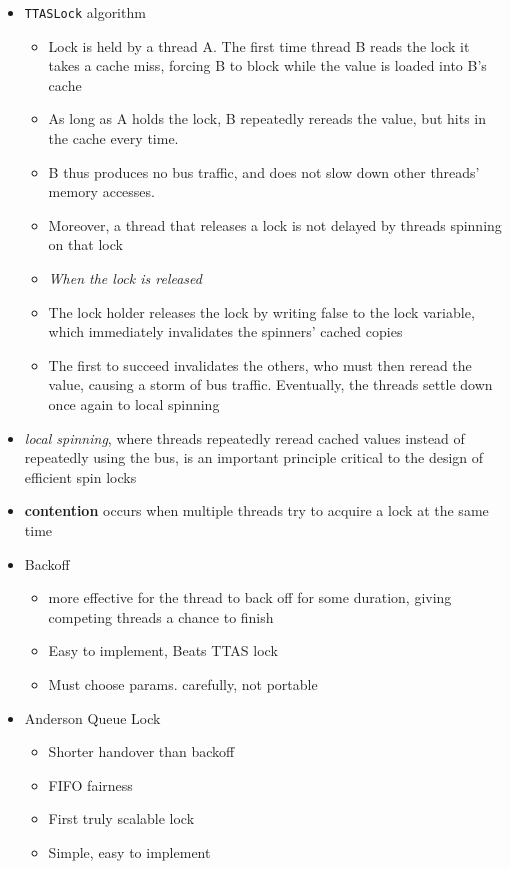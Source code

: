 \documentclass[12pt]{article}
\begin{document}
{\begin{itemize}
\begin{itemize}
\begin{itemize}
		\end{itemize}
		\item \texttt{TTASLock} algorithm
		\begin{itemize}
			\item Lock is held by a thread A. The first time thread B reads the lock it takes a cache miss, forcing B to block while the value is loaded into B’s cache
			\item As long as A holds the lock, B repeatedly rereads the value, but hits in the cache every time. 
			\item B thus produces no bus traffic, and does not slow down other threads’ memory accesses.
			\item Moreover, a thread that releases a lock is not delayed by threads spinning on that lock
			\item \textit{When the lock is released}
			\item The lock holder releases the lock by writing false to the lock variable, which immediately invalidates the spinners’ cached copies
			\item The first to succeed invalidates the others, who must then reread the value,
			causing a storm of bus traffic. Eventually, the threads settle down once again to
			local spinning
		\end{itemize}
		\item \textit{local spinning}, where threads repeatedly reread cached values
		instead of repeatedly using the bus, is an important principle critical to the design
		of efficient spin locks
		\item \textbf{contention} occurs when multiple threads try to acquire a lock at the same time
		\item Backoff
		\begin{itemize}
			\item more effective for the thread to back off for some duration, giving competing threads a chance to finish
			\item Easy to implement, Beats TTAS lock
			\item Must choose params. carefully, not portable
		\end{itemize}
		\item Anderson Queue Lock
		\begin{itemize}
			\item Shorter handover than backoff
			\item FIFO fairness
			\item First truly scalable lock
			\item Simple, easy to implement

\end{itemize}
\end{itemize}
\end{itemize}}
\end{document}
